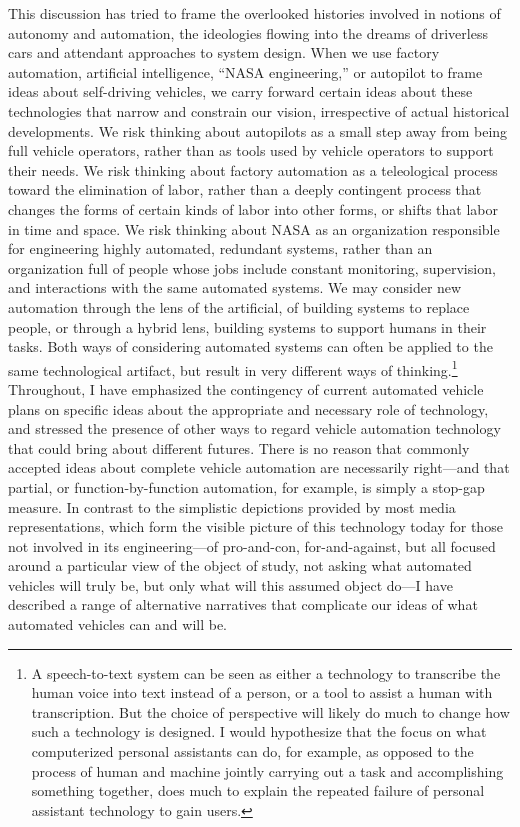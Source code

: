 This discussion has tried to frame the overlooked histories involved in
notions of autonomy and automation, the ideologies flowing into the
dreams of driverless cars and attendant approaches to system design.
When we use factory automation, artificial intelligence, ``NASA
engineering,'' or autopilot to frame ideas about self-driving
vehicles, we carry forward certain ideas about these technologies that
narrow and constrain our vision, irrespective of actual historical
developments. We risk 
thinking about autopilots as a small step away from being full vehicle
operators, rather than as tools used by vehicle operators to support
their needs. We risk thinking about factory automation as a
teleological process toward the elimination of labor, rather than a
deeply contingent process that changes the forms of certain kinds of
labor into other forms, or shifts that labor in time and space. We
risk thinking about NASA as an organization responsible for
engineering highly automated, redundant systems, rather than an
organization full of people whose jobs include constant monitoring,
supervision, and interactions with the same automated systems. We may
consider new automation through the lens of the artificial, of
building systems to replace people, or through a hybrid lens, building
systems to support humans in their tasks. Both ways of considering
automated systems can often be applied to the same technological
artifact, but result in very different ways of thinking.\footnote{A
speech-to-text system can be seen as either a technology to transcribe 
the human voice into text instead of a person, or a tool to assist a
human with transcription. But the choice of perspective will likely do
much to change how such a technology is designed. I would hypothesize that
the focus on what computerized personal assistants can do, for
example, as opposed to the process of human and machine jointly
carrying out a task and accomplishing something together, does much to
explain the repeated failure of personal assistant technology to gain
users.}  Throughout, I have emphasized the contingency of current
automated vehicle plans on specific ideas about the appropriate and
necessary role of technology, and stressed the presence of other ways
to regard vehicle automation technology that could bring about
different futures. There is no reason that commonly accepted ideas
about complete vehicle automation are necessarily right---and that
partial, or function-by-function automation, for example, is simply a
stop-gap measure. In contrast to the simplistic depictions provided by
most media representations, which form the visible picture of this technology today
for those not involved in its engineering---of pro-and-con, for-and-against, but all
focused around a particular view of the object of study, not asking
what automated vehicles will truly be, but only what will this assumed
object do---I have described a
range of alternative narratives that complicate our ideas of what
automated vehicles can and will be.

